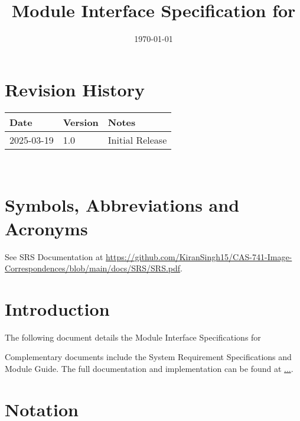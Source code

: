\documentclass[12pt, titlepage]{article}
\begin{document}
\title{Module Interface Specification for \progname{}}

\author{\authname}

\date{\today}

\maketitle


\section{Revision History}

\begin{tabularx}{\textwidth}{p{3cm}p{2cm}X}
\toprule {\bf Date} & {\bf Version} & {\bf Notes}\\
\midrule
2025-03-19 & 1.0 & Initial Release\\
\bottomrule
\end{tabularx}

~\newpage

\section{Symbols, Abbreviations and Acronyms}

See SRS Documentation at \url{https://github.com/KiranSingh15/CAS-741-Image-Correspondences/blob/main/docs/SRS/SRS.pdf}.


\newpage

\tableofcontents

\newpage


\section{Introduction}

The following document details the Module Interface Specifications for

Complementary documents include the System Requirement Specifications
and Module Guide.  The full documentation and implementation can be
found at \url{...}.  

\section{Notation}
\end{document}
